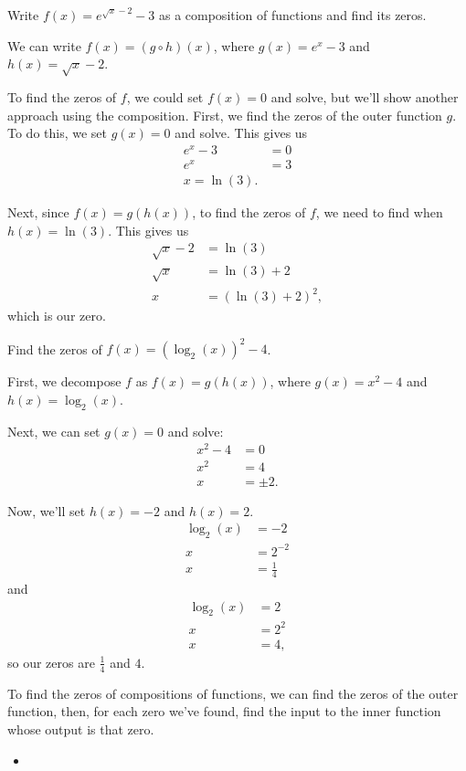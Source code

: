 \documentclass[nooutcomes]{ximera}
\begin{document}
\begin{example}
Write $f(x) = e^{\sqrt{x} - 2} - 3$ as a composition of functions and find its zeros.
\begin{explanation}
We can write $f(x) = (g \circ h)(x)$, where $g(x) = e^x - 3$ and $h(x) = \sqrt{x} - 2$. 

To find the zeros of $f$, we could set $f(x) = 0$ and solve, but we'll show another approach using the composition. First, we find the zeros of the outer function $g$. To do this, we set $g(x) = 0$ and solve. This gives us
\begin{align*}
e^x - 3 & = 0\\
e^x & = 3 \\
x = \ln(3).
\end{align*}

Next, since $f(x) = g(h(x))$, to find the zeros of $f$, we need to find when $h(x) = \ln(3)$. This gives us
\begin{align*}
\sqrt{x} - 2 & = \ln(3)\\
\sqrt{x} & = \ln(3) + 2 \\
x & = (\ln(3) + 2)^2,
\end{align*}
which is our zero. 


\end{explanation}
\end{example}

\begin{example}
Find the zeros of $f(x) = (\log_2(x))^2 - 4$. 
\begin{explanation}
First, we decompose $f$ as $f(x) = g(h(x))$, where $g(x) = x^2 - 4$ and $h(x) = \log_2(x)$.

Next, we can set $g(x) = 0$ and solve:
\begin{align*}
x^2 - 4 & = 0 \\
x^2 & = 4 \\
x & = \pm 2.
\end{align*}

Now, we'll set $h(x) = -2$ and $h(x) = 2$. 
\begin{align*}
\log_2(x) & = -2 \\
x & = 2^{-2} \\
x & = \frac{1}{4}
\end{align*}
and
\begin{align*}
\log_2(x) & = 2 \\
x & = 2^{2} \\
x & = 4,
\end{align*}
so our zeros are $\frac{1}{4}$ and $4$. 
\end{explanation}
\end{example}


To find the zeros of compositions of functions, we can find the zeros of the outer function, then, for each zero we've found, find the input to the inner function whose output is that zero. 

\begin{summary}\begin{itemize}
\item 
\end{itemize}\end{summary}
\end{document}
